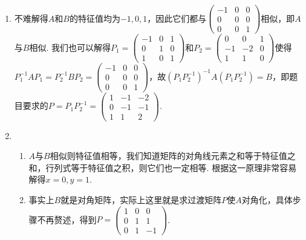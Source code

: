 \begin{enumerate}
    \item 不难解得$A$和$B$的特征值均为$-1,0,1$，因此它们都与$\begin{pmatrix}
                  -1 & 0 & 0 \\ 0 & 0 & 0 \\ 0 & 0 & 1
              \end{pmatrix}$相似，即$A$与$B$相似. 我们也可以解得$P_1=\begin{pmatrix}
                  -1 & 0 & 1 \\ 0 & 1 & 0 \\ 1 & 0 & 1
              \end{pmatrix}$和$P_2=\begin{pmatrix}
                  0 & 0 & 1 \\ -1 & -2 & 0 \\ 1 & 1 & 0
              \end{pmatrix}$使得$P_1^{-1}AP_1=P_2^{-1}BP_2=\begin{pmatrix}
                  -1 & 0 & 0 \\ 0 & 0 & 0 \\ 0 & 0 & 1
              \end{pmatrix}$，故$(P_1P_2^{-1})^{-1}A(P_1P_2^{-1})=B$，即题目要求的$P=P_1P_2^{-1}=\begin{pmatrix}
                  1 & -1 & -2 \\ 0 & -1 & -1 \\ 1 & 1 & 2
              \end{pmatrix}$.

    \item \begin{enumerate}
              \item $A$与$B$相似则特征值相等，我们知道矩阵的对角线元素之和等于特征值之和，行列式等于特征值之积，则它们也一定相等. 根据这一原理非常容易解得$x=0,y=1$.

              \item 事实上$B$就是对角矩阵，实际上这里就是求过渡矩阵$P$使$A$对角化，具体步骤不再赘述，得到$P=\begin{pmatrix}
                            1 & 0 & 0 \\ 0 & 1 & 1 \\ 0 & 1 & -1
                        \end{pmatrix}$.
          \end{enumerate}


\end{enumerate}
